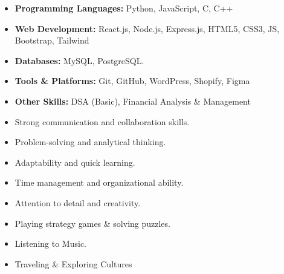 \documentclass[10pt,a4paper,ragged2e]{altacv}
\begin{document}
\smallskip
\begin{itemize}
\item \textbf{Programming Languages: }Python, JavaScript, C, C++
\smallskip
\item \textbf{Web Development: }React.js, Node.js, Express.js, HTML5, CSS3, JS, Bootstrap, Tailwind
\smallskip
\item \textbf{Databases: }MySQL, PostgreSQL.
\smallskip
\item  \textbf{Tools \& Platforms:} Git, GitHub, WordPress, Shopify, Figma 
\smallskip
\item \textbf{Other Skills:} DSA (Basic), Financial Analysis \& Management 
\smallskip


\end{itemize}
\smallskip
\begin{itemize}
\item Strong communication and collaboration skills.
\smallskip
\item Problem-solving and analytical thinking.
\smallskip
\item Adaptability and quick learning.
\smallskip
\item Time management and organizational ability.
\smallskip
\item Attention to detail and creativity.
\smallskip
\end{itemize}

\smallskip
\begin{itemize}
\item Playing strategy games \& solving puzzles.
\smallskip
\item Listening to Music.
\smallskip
\item Traveling \& Exploring Cultures
\end{itemize}

\clearpage
\end{document}
